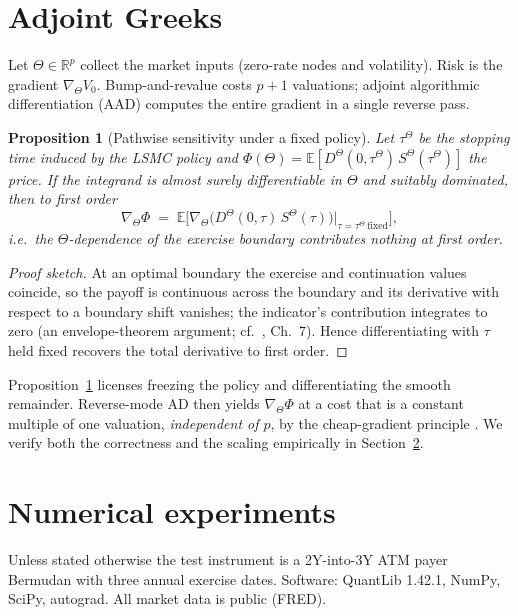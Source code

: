 \documentclass[11pt]{article}
\theoremstyle{plain}
\newtheorem{proposition}{Proposition}
\theoremstyle{definition}
\newcommand{\E}{\mathbb{E}}
\newcommand{\R}{\mathbb{R}}
\begin{document}
\section{Adjoint Greeks}
\label{sec:aad}

Let $\Theta\in\R^p$ collect the market inputs (zero-rate nodes and volatility). Risk is the
gradient $\nabla_\Theta V_0$. Bump-and-revalue costs $p+1$ valuations; adjoint algorithmic
differentiation (AAD) computes the entire gradient in a single reverse pass.

\begin{proposition}[Pathwise sensitivity under a fixed policy]
\label{prop:env}
Let $\tau^\Theta$ be the stopping time induced by the LSMC policy and
$\Phi(\Theta)=\E[D^\Theta(0,\tau^\Theta)\,S^\Theta(\tau^\Theta)]$ the price. If the integrand is
almost surely differentiable in $\Theta$ and suitably dominated, then to first order
\[
\nabla_\Theta\Phi \;=\; \E\big[\nabla_\Theta\big(D^\Theta(0,\tau)\,S^\Theta(\tau)\big)\big|_{\tau=\tau^\Theta\ \mathrm{fixed}}\big],
\]
i.e.\ the $\Theta$-dependence of the exercise boundary contributes nothing at first order.
\end{proposition}

\begin{proof}[Proof sketch]
At an optimal boundary the exercise and continuation values coincide, so the payoff is
continuous across the boundary and its derivative with respect to a boundary shift vanishes; the
indicator's contribution integrates to zero (an envelope-theorem argument; cf.\
\cite{Glasserman2004}, Ch.~7). Hence differentiating with $\tau$ held fixed recovers the total
derivative to first order.
\end{proof}

Proposition~\ref{prop:env} licenses freezing the policy and differentiating the smooth
remainder. Reverse-mode AD then yields $\nabla_\Theta\Phi$ at a cost that is a constant multiple
of one valuation, \emph{independent of $p$}, by the cheap-gradient principle
\cite{GriewankWalther2008,GilesGlasserman2006}. We verify both the correctness and the scaling
empirically in Section~\ref{sec:numres}.

\section{Numerical experiments}
\label{sec:numres}

Unless stated otherwise the test instrument is a 2Y-into-3Y ATM payer Bermudan with three
annual exercise dates. Software: QuantLib 1.42.1, NumPy, SciPy, autograd. All market data is
public (FRED).
\end{document}
